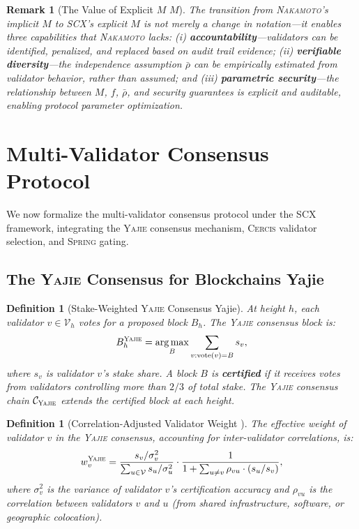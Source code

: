 \documentclass[11pt,a4paper]{article}
\newtheorem{definition}[theorem]{Definition}
\newtheorem{remark}[theorem]{Remark}
\theoremstyle{definition}
\newcommand{\Yajie}{\textsc{Yajie}}
\newcommand{\Spring}{\textsc{Spring}}
\newcommand{\Cercis}{\textsc{Cercis}}
\newcommand{\SCX}{\textsc{SCX}}
\DeclareMathOperator*{\argmax}{arg\,max}
\newcommand{\validatorSet}{\mathcal{V}}
\newcommand{\Nakamoto}{\textsc{Nakamoto}}
\begin{document}
\begin{remark}[The Value of Explicit $M$ $M$]
\label{rem:explicit_M_value}
The transition from \Nakamoto's implicit $M$ to \SCX's explicit $M$ is not merely a change in notation—it enables three capabilities that \Nakamoto{} lacks: (i) \textbf{accountability}—validators can be identified, penalized, and replaced based on audit trail evidence; (ii) \textbf{verifiable diversity}—the independence assumption $\bar{\rho}$ can be empirically estimated from validator behavior, rather than assumed; and (iii) \textbf{parametric security}—the relationship between $M$, $f$, $\bar{\rho}$, and security guarantees is explicit and auditable, enabling protocol parameter optimization.
\end{remark}
\section{Multi-Validator Consensus Protocol}
\label{sec:protocol}
We now formalize the multi-validator consensus protocol under the \SCX{} framework, integrating the \Yajie{} consensus mechanism, \Cercis{} validator selection, and \Spring{} gating.
\subsection{The \Yajie{} Consensus for Blockchains Yajie}
\begin{definition}[Stake-Weighted \Yajie{} Consensus Yajie]
\label{def:yajie_consensus_blockchain}
At height $h$, each validator $v \in \validatorSet_h$ votes for a proposed block $B_h$. The \Yajie{} consensus block is:
\begin{equation}
    B_h^{\Yajie} = \argmax_{B} \sum_{v: \mathrm{vote}(v) = B} s_v,
    \label{eq:yajie_block}
\end{equation}
where $s_v$ is validator $v$'s stake share. A block $B$ is \textbf{certified} if it receives votes from validators controlling more than $2/3$ of total stake. The \Yajie{} consensus chain $\mathcal{C}_{\Yajie}$ extends the certified block at each height.
\end{definition}
\begin{definition}[Correlation-Adjusted Validator Weight ]
\label{def:corr_adjusted_weight}
The effective weight of validator $v$ in the \Yajie{} consensus, accounting for inter-validator correlations, is:
\begin{equation}
    w_v^{\Yajie} = \frac{s_v / \sigma_v^2}{\sum_{u \in \validatorSet} s_u / \sigma_u^2} \cdot \frac{1}{1 + \sum_{u \neq v} \rho_{vu} \cdot (s_u / s_v)},
    \label{eq:yajie_weight_validator}
\end{equation}
where $\sigma_v^2$ is the variance of validator $v$'s certification accuracy and $\rho_{vu}$ is the correlation between validators $v$ and $u$ (from shared infrastructure, software, or geographic colocation).
\end{definition}
\end{document}
